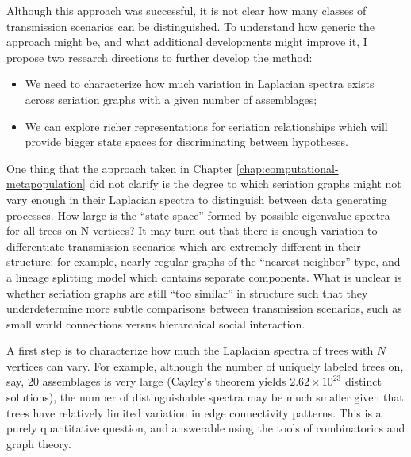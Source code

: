 Although this approach was successful, it is not clear how many classes of transmission scenarios can be distinguished.  To understand how generic the approach might be, and what additional developments might improve it, I propose two research directions to further develop the method:

\begin{itemize}
    \item We need to characterize how much variation in Laplacian spectra exists across seriation graphs with a given number of assemblages;
    \item We can explore richer representations for seriation relationships which will provide bigger state spaces for discriminating between hypotheses.
\end{itemize}

One thing that the approach taken in Chapter \ref{chap:computational-metapopulation} did not clarify is the degree to which seriation graphs might not vary enough in their Laplacian spectra to distinguish between data generating processes.  How large is the ``state space'' formed by possible eigenvalue spectra for all trees on N vertices?  It may turn out that there is enough variation to differentiate transmission scenarios which are extremely different in their structure:  for example, nearly regular graphs of the ``nearest neighbor'' type, and a lineage splitting model which contains separate components.  What is unclear is whether seriation graphs are still ``too similar'' in structure such that they underdetermine more subtle comparisons between transmission scenarios, such as small world connections versus hierarchical social interaction.  

A first step is to characterize how much the Laplacian spectra of trees with $N$ vertices can vary.  For example, although the number of uniquely labeled trees on, say, 20 assemblages is very large (Cayley's theorem yields $2.62 \times 10^{23}$ distinct solutions), the number of distinguishable spectra may be much smaller given that trees have relatively limited variation in edge connectivity patterns.  This is a purely quantitative question, and answerable using the tools of combinatorics and graph theory.  


